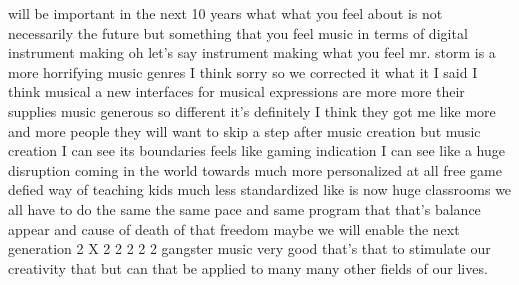 will be important in the next 10 years what what you feel about is not necessarily the future but something that you feel music in terms of digital instrument making oh let's say instrument making what you feel mr. storm is a more horrifying music genres I think sorry so we corrected it what it I said I think musical a new interfaces for musical expressions are more more their supplies music generous so different it's definitely I think they got me like more and more people they will want to skip a step after music creation but music creation I can see its boundaries feels like gaming indication I can see like a huge disruption coming in the world towards much more personalized at all free game defied way of teaching kids much less standardized like is now huge classrooms we all have to do the same the same pace and same program that that's balance appear and cause of death of that freedom maybe we will enable the next generation 2 X 2 2 2 2 2 gangster music very good that's that to stimulate our creativity that but can that be applied to many many other fields of our lives.